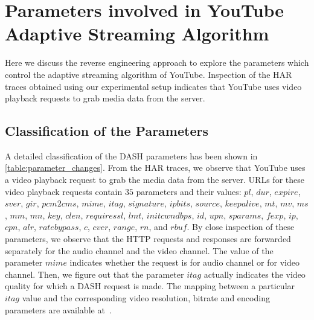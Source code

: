 \section{Parameters involved in YouTube Adaptive Streaming Algorithm}
\label{chap03s1:sec:parameters}
Here we discuss the reverse engineering approach to explore the parameters which control the adaptive streaming algorithm of YouTube.
Inspection of the \ac{HAR} traces obtained using our experimental setup indicates that YouTube uses video playback requests to grab media data from the server.
%
\subsection{Classification of the Parameters}
A detailed classification of the \ac{DASH} parameters has been shown in \tbl\ref{table:parameter_changes}. From the \ac{HAR} traces, we observe that YouTube uses a video playback request to grab the media data from the server. \acp{URL} for these video playback requests contain $35$ parameters and their values: $pl$, $dur$, $expire$, $sver$, $gir$, $pcm2cms$, $mime$, $itag$, $signature$, $ipbits$, $source$, $keepalive$, $mt$, $mv$, $ms$, $mm$, $mn$, $key$, $clen$, $requiressl$, $lmt$, $initcwndbps$, $id$, $upn$, $sparams$, $fexp$, $ip$, $cpn$, $alr$, $ratebypass$, $c$, $cver$, $range$, $rn$, and $rbuf$. By close inspection of these parameters, we observe that the \ac{HTTP} requests and responses are forwarded separately for the audio channel and the video channel. The value of the parameter $mime$ indicates whether the request is for audio channel or for video channel. Then, we figure out that the parameter $itag$ actually indicates the video quality for which a \ac{DASH} request is made.  The mapping between a particular $itag$ value and the corresponding video resolution, bitrate and encoding parameters are available at~\cite{itag}.

